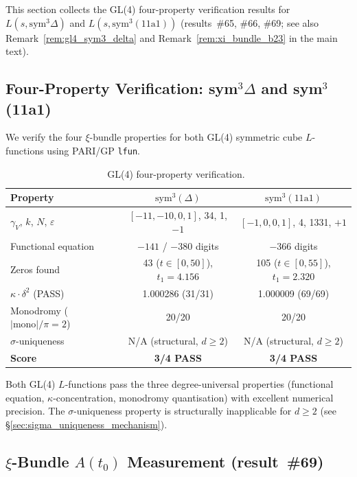 \documentclass[11pt, a4paper]{article}
\theoremstyle{definition}
\theoremstyle{plain}
\begin{document}
This section collects the GL(4) four-property verification results for
$L(s, \mathrm{sym}^3\Delta)$ and $L(s, \mathrm{sym}^3(11\mathrm{a}1))$
(results~\#65, \#66, \#69; see also Remark~\ref{rem:gl4_sym3_delta} and
Remark~\ref{rem:xi_bundle_b23} in the main text).

\subsection{Four-Property Verification: sym$^3\Delta$ and sym$^3$(11a1)}
\label{subsec:gl4_fourprop}

We verify the four $\xi$-bundle properties for both GL(4) symmetric cube
$L$-functions using PARI/GP \texttt{lfun}.

\begin{table}[ht]
\centering
\caption{GL(4) four-property verification.~\label{tab:gl4_fourprop}}
\smallskip
\begin{tabular}{lcc}
\toprule
Property & $\mathrm{sym}^3(\Delta)$ & $\mathrm{sym}^3(11\mathrm{a}1)$ \\
\midrule
$\gamma_V$, $k$, $N$, $\varepsilon$ & $[-11,-10,0,1]$, 34, 1, $-1$ & $[-1,0,0,1]$, 4, 1331, $+1$ \\
Functional equation & $-141$ / $-380$ digits & $-366$ digits \\
Zeros found & 43 ($t{\in}[0,50]$), $t_1{=}4.156$ & 105 ($t{\in}[0,55]$), $t_1{=}2.320$ \\
$\kappa{\cdot}\delta^2$ (PASS) & 1.000286 (31/31) & 1.000009 (69/69) \\
Monodromy ($|\mathrm{mono}|/\pi{=}2$) & 20/20 & 20/20 \\
$\sigma$-uniqueness & N/A (structural, $d{\geq}2$) & N/A (structural, $d{\geq}2$) \\
\midrule
\textbf{Score} & \textbf{3/4 PASS} & \textbf{3/4 PASS} \\
\bottomrule
\end{tabular}
\end{table}

\noindent
Both GL(4) $L$-functions pass the three degree-universal properties
(functional equation, $\kappa$-concentration, monodromy quantisation)
with excellent numerical precision.
The $\sigma$-uniqueness property is structurally inapplicable
for $d \geq 2$ (see \S\ref{sec:sigma_uniqueness_mechanism}).

\subsection{$\xi$-Bundle $A(t_0)$ Measurement (result~\#69)}
\label{subsec:gl4_xi_bundle}
\end{document}
